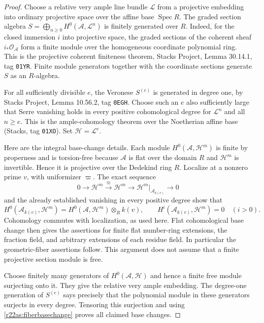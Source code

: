 \begin{proof}
Choose a relative very ample line bundle $\mathcal L$
from a projective embedding into ordinary projective
space over the affine base $\operatorname{Spec}R$.
The graded section algebra
$S=\bigoplus_{n\ge0}H^0(\mathcal A,\mathcal L^n)$
is finitely generated over $R$.  Indeed, for the
closed immersion $i$ into projective space, the
graded sections of the coherent sheaf $i_*\mathcal O_{\mathcal A}$
form a finite module over the homogeneous coordinate
polynomial ring.  This is the projective coherent
finiteness theorem, Stacks Project, Lemma 30.14.1,
tag \texttt{01YR}.  Finite module generators together
with the coordinate sections generate $S$ as an
$R$-algebra.

For all sufficiently divisible $e$, the Veronese
$S^{(e)}$ is generated in degree one, by Stacks
Project, Lemma 10.56.2, tag \texttt{0EGH}.  Choose
such an $e$ also sufficiently large that Serre
vanishing holds in every positive cohomological
degree for $\mathcal L^n$ and all $n\ge e$.
This is the ample-cohomology theorem over the
Noetherian affine base (Stacks, tag \texttt{01XO}).
Set $\mathcal H=\mathcal L^e$.

Here are the integral base-change details.  Each
module $H^0(\mathcal A,\mathcal H^m)$ is finite by
properness and is torsion-free because $\mathcal A$
is flat over the domain $R$ and $\mathcal H^m$ is
invertible.  Hence it is projective over the
Dedekind ring $R$.  Localize at a nonzero prime
$v$, with uniformizer $\varpi$.  The exact sequence
\[
 0\longrightarrow\mathcal H^m
   \xrightarrow{\ \varpi\ }\mathcal H^m
   \longrightarrow\mathcal H^m|_{\mathcal A_{k(v)}}
   \longrightarrow0
 \tag{AS22.3}\label{r22as:basechange}
\]
and the already established vanishing in every
positive degree show that
\[
 H^0(\mathcal A_{k(v)},\mathcal H^m)
       =H^0(\mathcal A,\mathcal H^m)\otimes_R k(v),
 \qquad H^i(\mathcal A_{k(v)},\mathcal H^m)=0
                  \quad(i>0).
 \tag{AS22.4}\label{r22as:fiberbasechange}
\]
Cohomology commutes with localization, as used
here.  Flat cohomological base change then gives
the assertions for finite flat number-ring
extensions, the fraction field, and arbitrary
extensions of each residue field.  In particular
the geometric-fiber assertions follow.  This
argument does not assume that a finite projective
section module is free.

Choose finitely many generators of
$H^0(\mathcal A,\mathcal H)$ and hence a finite free
module surjecting onto it.  They give the relative
very ample embedding.  The degree-one generation
of $S^{(e)}$ says precisely that the polynomial
module in these generators surjects in every
degree.  Tensoring this surjection and using
\eqref{r22as:fiberbasechange} proves all claimed
base changes.


\end{proof}
